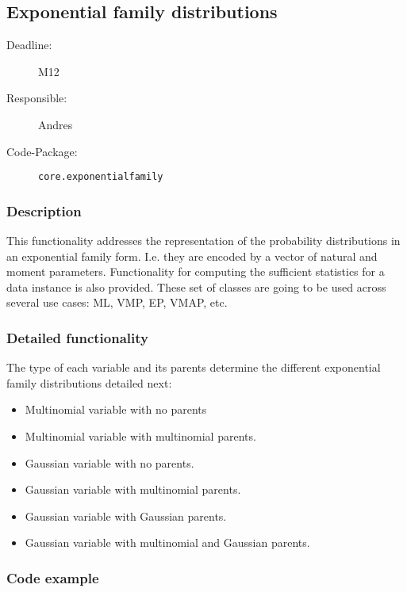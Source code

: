 \newpage
\subsection{Exponential family distributions}
\label{Functionality:ID}

\begin{description}
\item[Deadline:] M12
\item[Responsible:] Andres
\item[Code-Package:] \texttt{core.exponentialfamily}
\end{description}

\subsubsection*{Description}

This functionality addresses the representation of the probability distributions in an exponential family form. I.e. they are encoded by a vector of natural and moment parameters. Functionality for computing the sufficient statistics for a data instance is also provided. These set of classes are going to be used across several use cases:  ML, VMP, EP, VMAP, etc. 

\subsubsection*{Detailed functionality}

The type of each variable and its parents determine the different exponential family distributions detailed next:

\begin{itemize}
\item Multinomial variable with no parents
\item Multinomial variable with multinomial parents.
\item Gaussian variable with no parents.
\item Gaussian variable with multinomial parents.
\item Gaussian variable with Gaussian parents. 
\item Gaussian variable with multinomial and Gaussian parents. 

\end{itemize}

\subsubsection*{Code example}